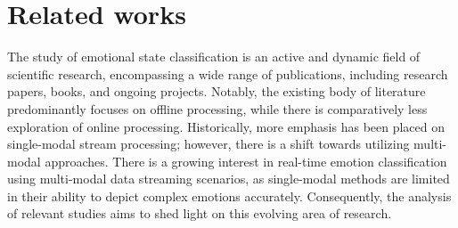 \graphicspath{{Figures/}}

\chapter{Related works}\label{ch:related-works}
The study of emotional state classification is an active and dynamic field of scientific research, encompassing a wide range of publications, including research papers, books, and ongoing projects. Notably, the existing body of literature predominantly focuses on offline processing, while there is comparatively less exploration of online processing. Historically, more emphasis has been placed on single-modal stream processing; however, there is a shift towards utilizing multi-modal approaches. There is a growing interest in real-time emotion classification using multi-modal data streaming scenarios, as single-modal methods are limited in their ability to depict complex emotions accurately. Consequently, the analysis of relevant studies aims to shed light on this evolving area of research.

